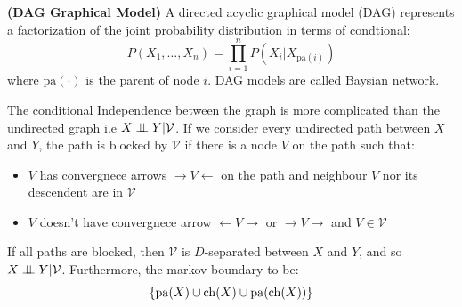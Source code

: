 \begin{definition}{\textbf{(DAG Graphical Model)}}
    A directed acyclic graphical model (DAG) represents a factorization of the joint probability distribution in terms of condtional:
    \begin{equation*}
        P(X_1,\dots,X_n) = \prod^n_{i=1}P(X_i | X_{\text{pa}(i)})
    \end{equation*} 
    where $\text{pa}(\cdot)$ is the parent of node $i$. DAG models are called Baysian network.
\end{definition}

\begin{proposition}
    The conditional Independence between the graph is more complicated than the undirected graph i.e $X\perp \!\!\! \perp Y | \mathcal{V}$. If we consider every undirected path between $X$ and $Y$, the path is blocked by $\mathcal{V}$ if there is a node $V$ on the path such that:
    \begin{itemize}
        \item $V$ has convergnece arrows $\rightarrow V \leftarrow$ on the path and neighbour $V$ nor its descendent are in $\mathcal{V}$
        \item $V$ doesn't have convergnece arrow $\leftarrow V\rightarrow$ or $\rightarrow V \rightarrow$ and $V \in \mathcal{V}$ 
    \end{itemize}
    If all paths are blocked, then $\mathcal{V}$ is $D$-separated between $X$ and $Y$, and so $X\perp \!\!\! \perp Y | \mathcal{V}$. Furthermore, the markov boundary to be:
    \begin{equation*}
        \left\{ \operatorname{pa}(X)\cup\operatorname{ch}(X)\cup\operatorname{pa}(\operatorname{ch}(X)) \right\}
    \end{equation*}
\end{proposition}
